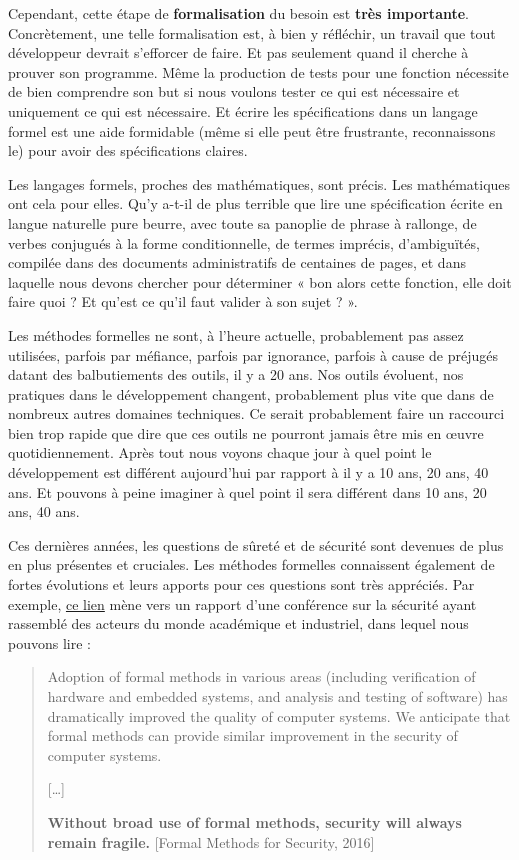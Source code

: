 \documentclass[12pt,francais,]{scrbook}
\begin{document}
Cependant, cette étape de \textbf{formalisation} du besoin est
\textbf{très importante}. Concrètement, une telle formalisation est, à
bien y réfléchir, un travail que tout développeur devrait s'efforcer de
faire. Et pas seulement quand il cherche à prouver son programme. Même
la production de tests pour une fonction nécessite de bien comprendre
son but si nous voulons tester ce qui est nécessaire et uniquement ce
qui est nécessaire. Et écrire les spécifications dans un langage formel
est une aide formidable (même si elle peut être frustrante,
reconnaissons le) pour avoir des spécifications claires.

Les langages formels, proches des mathématiques, sont précis. Les
mathématiques ont cela pour elles. Qu'y a-t-il de plus terrible que lire
une spécification écrite en langue naturelle pure beurre, avec toute sa
panoplie de phrase à rallonge, de verbes conjugués à la forme
conditionnelle, de termes imprécis, d'ambiguïtés, compilée dans des
documents administratifs de centaines de pages, et dans laquelle nous
devons chercher pour déterminer « bon alors cette fonction, elle doit
faire quoi ? Et qu'est ce qu'il faut valider à son sujet ? ».

Les méthodes formelles ne sont, à l'heure actuelle, probablement pas
assez utilisées, parfois par méfiance, parfois par ignorance, parfois à
cause de préjugés datant des balbutiements des outils, il y a 20 ans.
Nos outils évoluent, nos pratiques dans le développement changent,
probablement plus vite que dans de nombreux autres domaines techniques.
Ce serait probablement faire un raccourci bien trop rapide que dire que
ces outils ne pourront jamais être mis en œuvre quotidiennement. Après
tout nous voyons chaque jour à quel point le développement est différent
aujourd'hui par rapport à il y a 10 ans, 20 ans, 40 ans. Et pouvons à
peine imaginer à quel point il sera différent dans 10 ans, 20 ans, 40
ans.

Ces dernières années, les questions de sûreté et de sécurité sont
devenues de plus en plus présentes et cruciales. Les méthodes formelles
connaissent également de fortes évolutions et leurs apports pour ces
questions sont très appréciés. Par exemple,
\href{http://sfm.seas.harvard.edu/report.html}{ce lien} mène vers un
rapport d'une conférence sur la sécurité ayant rassemblé des acteurs du
monde académique et industriel, dans lequel nous pouvons lire :

\begin{quote}
Adoption of formal methods in various areas (including verification of
hardware and embedded systems, and analysis and testing of software) has
dramatically improved the quality of computer systems. We anticipate
that formal methods can provide similar improvement in the security of
computer systems.

{[}\ldots{}{]}

\textbf{Without broad use of formal methods, security will always remain
fragile.} \hfill{[}Formal Methods for Security, 2016{]}
\end{quote}
\end{document}
